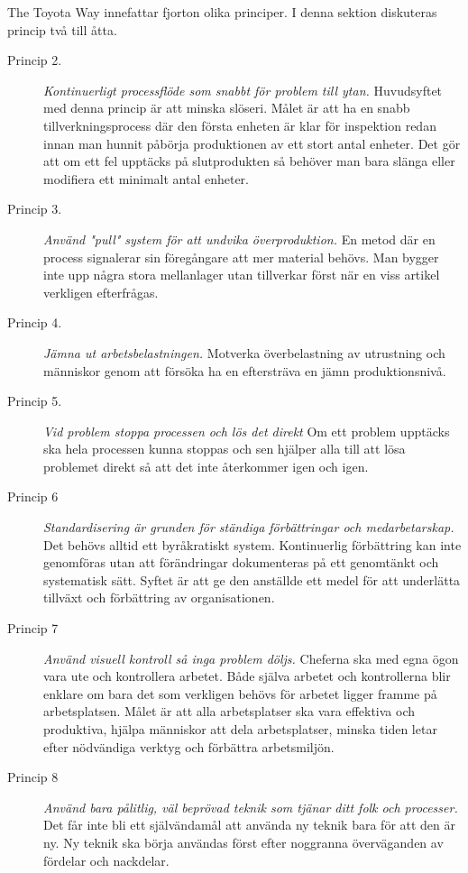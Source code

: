 \documentclass{article}
\begin{document}
The Toyota Way innefattar fjorton olika principer. I denna sektion diskuteras princip två till åtta.
\begin{description}
\item[Princip 2.]
\emph{Kontinuerligt processflöde som snabbt för problem till ytan.} Huvudsyftet med denna princip är att minska slöseri. Målet är att ha en snabb tillverkningsprocess där den första enheten är klar för inspektion redan innan man hunnit påbörja produktionen av ett stort antal enheter. Det gör att om ett fel upptäcks på slutprodukten så behöver man bara slänga eller modifiera ett minimalt antal enheter.
\item[Princip 3.]
\emph{Använd "pull" system för att undvika överproduktion.}
En metod där en process signalerar sin föregångare att mer material behövs. Man bygger inte upp några stora mellanlager utan tillverkar först när en viss artikel verkligen efterfrågas.
\item[Princip 4.]
\emph{Jämna ut arbetsbelastningen.}
Motverka överbelastning av utrustning och människor genom att försöka ha en eftersträva en jämn produktionsnivå.
\item[Princip 5.]
\emph{Vid problem stoppa processen och lös det direkt}
Om ett problem upptäcks ska hela processen kunna stoppas och sen hjälper alla till att lösa problemet direkt så att det inte återkommer igen och igen. 
\item[Princip 6]
\emph{Standardisering är grunden för ständiga förbättringar och medarbetarskap.}
Det behövs alltid ett byråkratiskt system. Kontinuerlig förbättring kan inte genomföras utan att förändringar dokumenteras på ett genomtänkt och systematisk sätt. Syftet är att ge den anställde ett medel för att underlätta tillväxt och förbättring av organisationen.
\item[Princip 7]
\emph{Använd visuell kontroll så inga problem döljs.} Cheferna ska med egna ögon vara ute och kontrollera arbetet. Både själva arbetet och kontrollerna blir enklare om bara det som verkligen behövs för arbetet ligger framme på arbetsplatsen. Målet är att alla arbetsplatser ska vara effektiva och produktiva, hjälpa människor att dela arbetsplatser, minska tiden letar efter nödvändiga verktyg och förbättra arbetsmiljön.
\item[Princip 8]
\emph{Använd bara pålitlig, väl beprövad teknik som tjänar ditt folk och processer.} Det får inte bli ett självändamål att använda ny teknik bara för att den är ny. Ny teknik ska börja användas först efter noggranna överväganden av fördelar och nackdelar.
\end{description}
\end{document}
